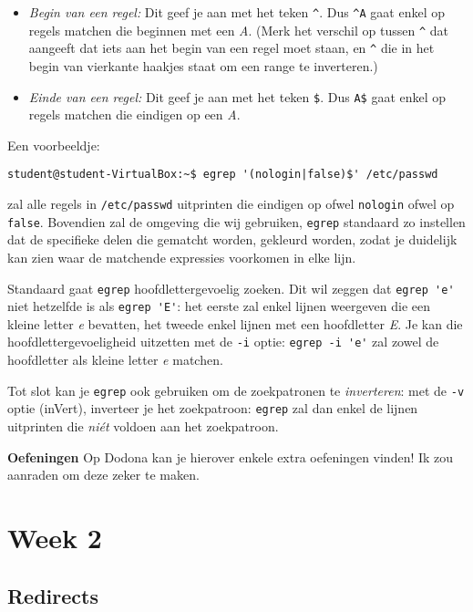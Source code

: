 \documentclass[a4paper,twoside,openany]{memoir}
\begin{document}
\begin{itemize}
  \item \emph{Begin van een regel:} Dit geef je aan met het teken \verb!^!. Dus
    \verb!^A! gaat enkel op regels matchen die beginnen met een \emph{A}. (Merk
    het verschil op tussen \verb!^! dat aangeeft dat iets aan het begin
    van een regel moet staan, en \verb!^! die in het begin van vierkante haakjes
    staat om een range te inverteren.)

  \item \emph{Einde van een regel:} Dit geef je aan met het teken \verb!$!. Dus
    \verb!A$! gaat enkel op regels matchen die eindigen op een \emph{A}.

\end{itemize}

Een voorbeeldje:

\begin{verbatim}
student@student-VirtualBox:~$ egrep '(nologin|false)$' /etc/passwd
\end{verbatim}

zal alle regels in \verb!/etc/passwd! uitprinten die eindigen op ofwel
\verb!nologin! ofwel op \verb!false!. Bovendien zal de omgeving die wij
gebruiken, \verb!egrep! standaard zo instellen dat de specifieke delen die
gematcht worden, gekleurd worden, zodat je duidelijk kan zien waar de matchende
expressies voorkomen in elke lijn.

Standaard gaat \verb!egrep! hoofdlettergevoelig zoeken. Dit wil zeggen dat \verb!egrep 'e'! niet hetzelfde is als \verb!egrep 'E'!: het eerste zal enkel lijnen weergeven die een kleine letter \emph{e} bevatten, het tweede enkel lijnen met een hoofdletter \emph{E}. Je kan die hoofdlettergevoeligheid uitzetten met de \verb!-i! optie: \verb!egrep -i 'e'! zal zowel de hoofdletter als kleine letter \emph{e} matchen.

Tot slot kan je \verb!egrep! ook gebruiken om de zoekpatronen te \emph{inverteren}: met de \verb!-v! optie (inVert), inverteer je het zoekpatroon: \verb!egrep! zal dan enkel de lijnen uitprinten die \emph{ni\'et} voldoen aan het zoekpatroon.

\textbf{Oefeningen} Op Dodona kan je hierover enkele extra oefeningen vinden! Ik zou aanraden om deze zeker te maken.

\part{Week 2}

\chapter{Redirects}
\end{document}
